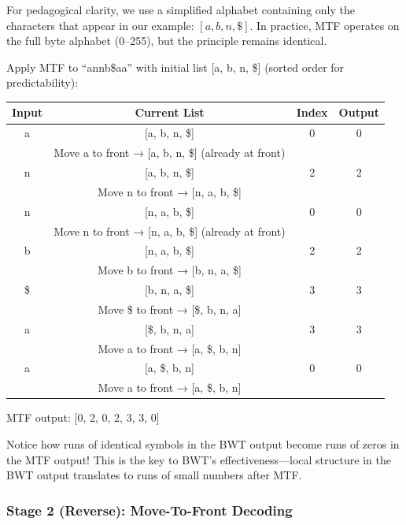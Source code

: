 \begin{examplebox}
For pedagogical clarity, we use a simplified alphabet containing only the characters that appear in our example: \([a, b, n, \$]\). In practice, MTF operates on the full byte alphabet (0–255), but the principle remains identical.

Apply MTF to ``annb\$aa'' with initial list [a, b, n, \$] (sorted order for predictability):

\begin{center}
\begin{tabular}{c|c|c|c}
\textbf{Input} & \textbf{Current List} & \textbf{Index} & \textbf{Output} \\
\hline
a & [a, b, n, \$] & 0 & 0 \\
  & Move a to front → [a, b, n, \$] (already at front) & & \\
n & [a, b, n, \$] & 2 & 2 \\
  & Move n to front → [n, a, b, \$] & & \\
n & [n, a, b, \$] & 0 & 0 \\
  & Move n to front → [n, a, b, \$] (already at front) & & \\
b & [n, a, b, \$] & 2 & 2 \\
  & Move b to front → [b, n, a, \$] & & \\
\$ & [b, n, a, \$] & 3 & 3 \\
  & Move \$ to front → [\$, b, n, a] & & \\
a & [\$, b, n, a] & 3 & 3 \\
  & Move a to front → [a, \$, b, n] & & \\
a & [a, \$, b, n] & 0 & 0 \\
  & Move a to front → [a, \$, b, n] & & \\
\end{tabular}
\end{center}

MTF output: [0, 2, 0, 2, 3, 3, 0]

Notice how runs of identical symbols in the BWT output become runs of zeros in the MTF output! This is the key to BWT's effectiveness—local structure in the BWT output translates to runs of small numbers after MTF.
\end{examplebox}


\subsubsection{Stage 2 (Reverse): Move-To-Front Decoding}

